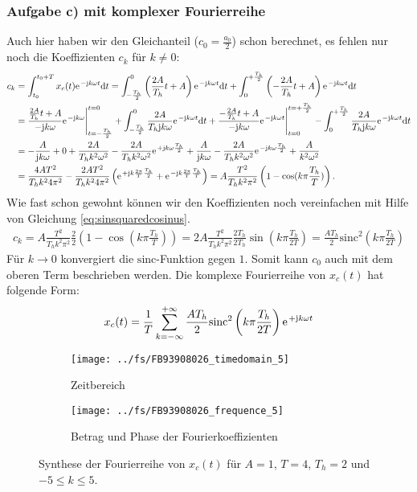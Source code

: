 \documentclass[11pt,a4paper,DIV=12]{scrartcl}
\newcommand{\diff}{\mathrm{d}}
\newcommand{\sinc}{\mathrm{sinc}}
\begin{document}
\subsubsection*{Aufgabe c) mit komplexer Fourierreihe}
%
Auch hier haben wir den Gleichanteil ($c_0=\frac{a_0}{2}$) schon berechnet,
es fehlen nur noch die Koeffizienten $c_k$ für $k\neq 0$:
%
%
%
\begin{align}
	c_k&=\int_{t_0}^{t_0+T}x_{c}(t)\e^{-\im k \omega t}\diff t
	=\int_{-\frac{T_h}{2}}^0\left (\frac{2A}{T_h}t+A\right )\e^{-\im k \omega t}\diff t+\int_0^{+\frac{T_h}{2}}\left (-\frac{2A}{T_h}t+A\right )\e^{-\im k \omega t}\diff t\nonumber \\
	&= \frac{\frac{2A}{T_h}t+A}{-\im k \omega}\e^{-\im k \omega}\Bigg|_{t=-\frac{T_h}{2}}^{t=0}+\int_{-\frac{T_h}{2}}^0\frac{2A}{T_h\im k\omega}\e^{-\im k \omega t}\diff t+\frac{-\frac{2A}{T_h}t+A}{-\im k \omega}\e^{-\im k \omega t}\Bigg |_{t=0}^{t=+\frac{T_h}{2}}-\int_0^{+\frac{T_h}{2}}\frac{2A}{T_h\im k\omega}\e^{-\im k \omega t}\diff t\nonumber \\
	&=-\frac{A}{\im k \omega}+0+\frac{2A}{T_h k^2\omega^2}-\frac{2A}{T_hk^2\omega^2}\e^{+\im k \omega \frac{T_h}{2}}+\frac{A}{\im k \omega}-\frac{2A}{T_hk^2\omega^2}\e^{-\im k \omega \frac{T_h}{2}}+\frac{A}{k^2\omega^2}\nonumber \\
	&=\frac{4AT^2}{T_hk^24\pi^2}-\frac{2AT^2}{T_hk^24\pi^2}\left (\e^{+\im k \frac{2\pi}{T}\frac{T_h}{2}}+\e^{-\im k\frac{2\pi}{T}\frac{T_h}{T}}\right )
	=A\frac{T^2}{T_hk^2\pi^2}\left (1-\cos(k\pi\frac{T_h}{T})\right ).
\end{align}
%
%
%
Wie fast schon gewohnt können wir den Koeffizienten noch vereinfachen
mit Hilfe von Gleichung \ref{eq:sinsquaredcosinus}.
%
%
\begin{gather}
	c_k=A\frac{T^2}{T_hk^2\pi^2}\frac{2}{2}\left (1-\cos(k\pi\frac{T_h}{T})\right )
	=2A\frac{T^2}{T_hk^2\pi^2}\frac{2T_h}{2T_h}\sin\left(k\pi\frac{T_h}{2T}\right)
	=\frac{AT_h}{2}\sinc^2\left(k\pi\frac{T_h}{2T}\right)
\end{gather}
%
%
Für $k\rightarrow0$ konvergiert die $\sinc$-Funktion gegen $1$.
%
Somit kann $c_0$ auch mit dem oberen Term beschrieben werden.
%
Die komplexe Fourierreihe von $x_{c}(t)$ hat folgende Form:
%
%
\begin{align}
	x_{c}(t)=\frac{1}{T}\sum_{k=-\infty}^{+\infty}\frac{AT_h}{2}\sinc^2\left(k\pi\frac{T_h}{2T}\right)\e^{+\im k \omega t}
\end{align}
%
%
\begin{figure}
	\centering
	\begin{subfigure}{\textwidth}
		\texttt{[image: ../fs/FB93908026\_timedomain\_5]}
		\caption{Zeitbereich}
	\end{subfigure}
	\begin{subfigure}{\textwidth}
		\texttt{[image: ../fs/FB93908026\_frequence\_5]}
		\caption{Betrag und Phase der Fourierkoeffizienten}
	\end{subfigure}
	\caption{Synthese der Fourierreihe von $x_c(t)$ für $A=1$, $T=4$, $T_h=2$ und
		$-5\leq k\leq5$.}
\end{figure}
\newpage
\end{document}
